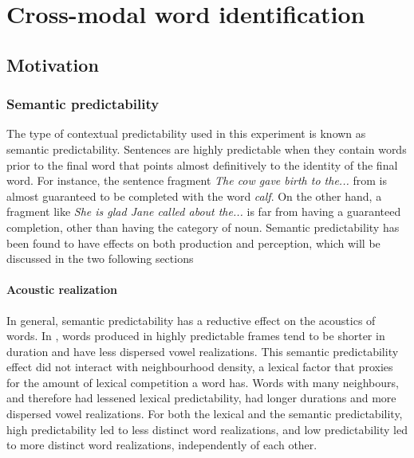 
\chapter{Cross-modal word identification}


\section{Motivation}

\subsection{Semantic predictability}

The type of contextual predictability used in this experiment is known as semantic predictability.  Sentences are highly predictable when they contain words prior to the final word that points almost definitively to the identity of the final word.  For instance, the sentence fragment \emph{The cow gave birth to the...} from \citet{Kalikow1977} is almost guaranteed to be completed with the word \emph{calf}.  On the other hand, a fragment like \emph{She is glad Jane called about the...} is far from having a guaranteed completion, other than having the category of noun. Semantic predictability has been found to have effects on both production and perception, which will be discussed in the two following sections

\subsubsection{Acoustic realization}

In general, semantic predictability has a reductive effect on the acoustics of words.  In \citet{Scarborough2010}, words produced in highly predictable frames tend to be shorter in duration and have less dispersed vowel realizations.  This semantic predictability effect did not interact with neighbourhood density, a lexical factor that proxies for the amount of lexical competition a word has.  Words with many neighbours, and therefore had lessened lexical predictability, had longer durations and more dispersed vowel realizations.  For both the lexical and the semantic predictability, high predictability led to less distinct word realizations, and low predictability led to more distinct word realizations, independently of each other.

